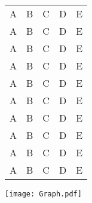 \documentclass[12pt]{article}
\begin{document}
\begin{tabular}{ | l |l |l |l |l |}
\hline
A & B & C & D & E \\
A & B & C & D & E \\
A & B & C & D & E \\
A & B & C & D & E \\
A & B & C & D & E \\
A & B & C & D & E \\
A & B & C & D & E \\
A & B & C & D & E \\
A & B & C & D & E \\
A & B & C & D & E \\
\hline
\end{tabular}

\texttt{[image: Graph.pdf]}
\end{document}
